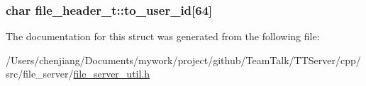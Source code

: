 \subsubsection[{to\+\_\+user\+\_\+id}]{\setlength{\rightskip}{0pt plus 5cm}char file\+\_\+header\+\_\+t\+::to\+\_\+user\+\_\+id\mbox{[}64\mbox{]}}\label{structfile__header__t_a2d7532af94190670e541be84704aa43b}


The documentation for this struct was generated from the following file\+:\begin{DoxyCompactItemize}
\item 
/\+Users/chenjiang/\+Documents/mywork/project/github/\+Team\+Talk/\+T\+T\+Server/cpp/src/file\+\_\+server/\hyperlink{file__server__util_8h}{file\+\_\+server\+\_\+util.\+h}\end{DoxyCompactItemize}
